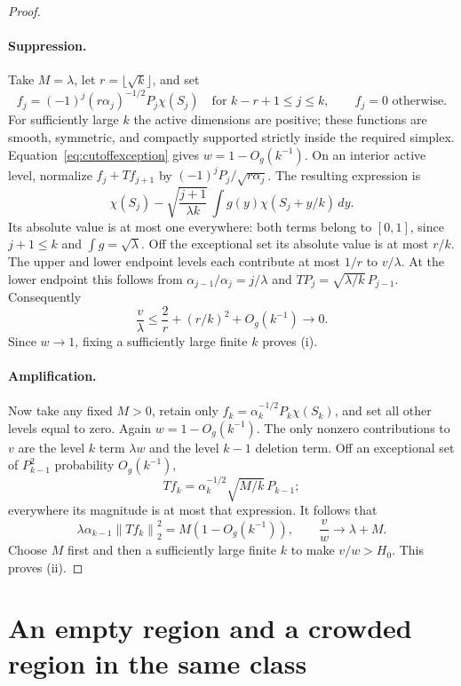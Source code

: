 \documentclass[11pt]{article}
\theoremstyle{remark}
\numberwithin{equation}{section}
\newcommand{\norm}[1]{\left\lVert#1\right\rVert}
\begin{document}
\begin{proof}
\paragraph{Suppression.}
Take $M=\lambda$, let $r=\lfloor\sqrt{k}\rfloor$, and set
\[
 f_j=(-1)^j(r\alpha_j)^{-1/2}P_j\chi(S_j)
 \quad\text{for }k-r+1\le j\le k,
 \qquad f_j=0\text{ otherwise}.
\]
For sufficiently large $k$ the active dimensions are positive;
these functions are smooth, symmetric, and compactly supported
strictly inside the required simplex.
Equation~\eqref{eq:cutoffexception} gives $w=1-O_g(k^{-1})$.
On an interior active level, normalize $f_j+Tf_{j+1}$ by
$(-1)^jP_j/\sqrt{r\alpha_j}$. The resulting expression is
\[
 \chi(S_j)-
 \sqrt{\frac{j+1}{\lambda k}}\,
       \int g(y)\chi(S_j+y/k)\,dy.
\]
Its absolute value is at most one everywhere: both terms
belong to $[0,1]$, since $j+1\le k$ and $\int g=\sqrt\lambda$.
Off the exceptional set its absolute value is at most $r/k$.
The upper and lower endpoint levels each contribute at most
$1/r$ to $v/\lambda$. At the lower endpoint this follows
from $\alpha_{j-1}/\alpha_j=j/\lambda$ and
$TP_j=\sqrt{\lambda/k}\,P_{j-1}$.
Consequently
\[
 \frac v\lambda
 \le\frac2r+(r/k)^2+O_g(k^{-1})\longrightarrow0.
\]
Since $w\to1$, fixing a sufficiently large finite $k$
proves (i).

\paragraph{Amplification.}
Now take any fixed $M>0$, retain only
$f_k=\alpha_k^{-1/2}P_k\chi(S_k)$, and set all other levels
equal to zero.
Again $w=1-O_g(k^{-1})$.
The only nonzero contributions to $v$ are the level $k$
term $\lambda w$ and the level $k-1$ deletion term.
Off an exceptional set of $P_{k-1}^2$ probability $O_g(k^{-1})$,
\[
 Tf_k=\alpha_k^{-1/2}\sqrt{M/k}\,P_{k-1};
\]
everywhere its magnitude is at most that expression.
It follows that
\[
 \lambda\alpha_{k-1}\norm{Tf_k}_2^2
   =M(1-O_g(k^{-1})),\qquad
 \frac vw\longrightarrow\lambda+M.
\]
Choose $M$ first and then a sufficiently large finite $k$
to make $v/w>H_0$. This proves (ii).
\end{proof}

\section{An empty region and a crowded region in the same class}
\label{sec:joint}
\end{document}
